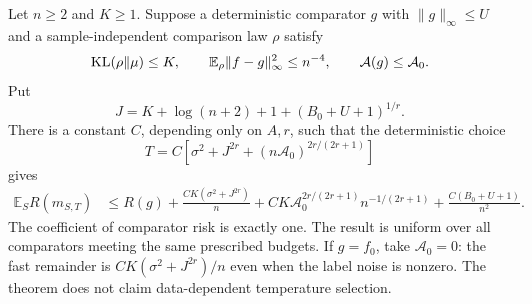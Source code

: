 \begin{theorem}
\label{thm:optimistic-raw-temperature}
Let $n\ge2$ and $K\ge1$. Suppose a deterministic comparator $g$ with $\|g\|_\infty\le U$ and a sample-independent comparison law $\rho$ satisfy
\[
 \operatorname{KL}(\rho\|\mu)\le K,
 \qquad \mathbb E_\rho\|f-g\|_\infty^2\le n^{-4},
 \qquad \mathcal A(g)\le\mathcal A_0.
\]
Put
\[
 J=K+\log(n+2)+1+(B_0+U+1)^{1/r}.
\]
There is a constant $C$, depending only on $A,r$, such that the deterministic choice
\begin{equation}
 T=C\left[\sigma^2+J^{2r}
                  +(n\mathcal A_0)^{2r/(2r+1)}\right]
 \label{eq:optimistic-temperature-choice}
\end{equation}
gives
\begin{align}
 \mathbb E_S R(m_{S,T})
 &\le R(g)+\frac{C K(\sigma^2+J^{2r})}{n}
      +C K\mathcal A_0^{2r/(2r+1)}n^{-1/(2r+1)}
      +\frac{C(B_0+U+1)}{n^2}.
 \label{eq:optimistic-raw-oracle}
\end{align}
The coefficient of comparator risk is exactly one. The result is uniform over all comparators meeting the same prescribed budgets. If $g=f_0$, take $\mathcal A_0=0$: the fast remainder is $CK(\sigma^2+J^{2r})/n$ even when the label noise is nonzero. The theorem does not claim data-dependent temperature selection.
\end{theorem}


